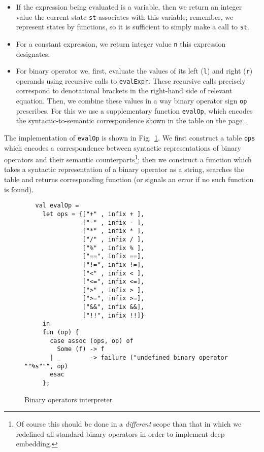 \begin{itemize}
\item If the expression being evaluated is a variable, then we return an integer value the current state \lstinline|st| associates with this variable; remember, we
  represent states by functions, so it is sufficient to simply make a call to \lstinline|st|.
\item For a constant expression, we return integer value \lstinline|n| this expression designates.
\item For binary operator we, first, evaluate the values of its left (\lstinline|l|) and right (\lstinline|r|) operands using recursive calls to \lstinline|evalExpr|. These
  recursive calls precisely correspond to denotational brackets in the right-hand side of relevant equation. Then, we combine these values in a way binary operator
  sign \lstinline|op| prescribes. For this we use a supplementary function \lstinline|evalOp|, which encodes the syntactic-to-semantic correspondence shown in the table
  on the page~\pageref{times-plus-tab}.
\end{itemize}

The implementation of \lstinline|evalOp| is shown in Fig.~\ref{binary-int}. We first construct a table \lstinline|ops| which encodes a correspondence between syntactic representations
of binary operators and their semantic counterparts\footnote{Of course this should be done in a \emph{different} scope than that in which we redefined all standard binary
operators in order to implement deep embedding.}; then we construct a function which takes a syntactic representation of a binary operator as a string, searches the table and
returns corresponding function (or signals an error if no such function is found).

\begin{figure}[t]
  \begin{lstlisting}
   val evalOp =
     let ops = {["+" , infix + ],
                ["-" , infix - ],
                ["*" , infix * ],
                ["/" , infix / ],
                ["%" , infix % ],
                ["==", infix ==],
                ["!=", infix !=],
                ["<" , infix < ],
                ["<=", infix <=],
                [">" , infix > ],
                [">=", infix >=],
                ["&&", infix &&],
                ["!!", infix !!]}
     in
     fun (op) {
       case assoc (ops, op) of
         Some (f) -> f
       | _        -> failure ("undefined binary operator ""%s""", op)
       esac  
     };
  \end{lstlisting}
  \caption{Binary operators interpreter}
  \label{binary-int}
\end{figure}

